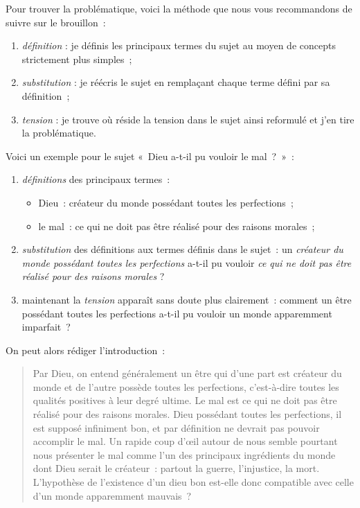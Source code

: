 \documentclass[a4paper]{article}
\begin{document}
Pour trouver la problématique, voici la méthode que nous vous
recommandons de suivre sur le brouillon :

\begin{enumerate}
\item \emph{définition} : je définis les principaux termes du sujet au moyen de
concepts strictement plus simples ;

\item \emph{substitution} : je réécris le sujet en remplaçant chaque terme
défini par sa définition ;

\item \emph{tension} : je trouve où réside la tension dans le sujet ainsi
reformulé et j'en tire la problématique.
\end{enumerate}

Voici un exemple pour le sujet « Dieu a-t-il pu vouloir le mal ? » :

\begin{enumerate}
\item \emph{définitions} des principaux termes :

\begin{itemize}
\item Dieu : créateur du monde possédant toutes les perfections ;

\item le mal : ce qui ne doit pas être réalisé pour des raisons
morales ;
\end{itemize}

\item \emph{substitution} des définitions aux termes définis dans le sujet : un
\emph{créateur du monde possédant toutes les perfections} a-t-il pu
vouloir \emph{ce qui ne doit pas être réalisé pour des raisons morales} ?

\item maintenant la \emph{tension} apparaît sans doute plus clairement : comment
un être possédant toutes les perfections a-t-il pu vouloir un monde
apparemment imparfait ?
\end{enumerate}

On peut alors rédiger l'introduction :

\begin{quote}
Par Dieu, on entend généralement un être qui d'une part est créateur
du monde et de l'autre possède toutes les perfections, c'est-à-dire
toutes les qualités positives à leur degré ultime. Le mal est ce qui
ne doit pas être réalisé pour des raisons morales. Dieu possédant
toutes les perfections, il est supposé infiniment bon, et par
définition ne devrait pas pouvoir accomplir le mal. Un rapide coup
d'œil autour de nous semble pourtant nous présenter le mal comme l'un
des principaux ingrédients du monde dont Dieu serait le créateur :
partout la guerre, l'injustice, la mort. L'hypothèse de l'existence
d'un dieu bon est-elle donc compatible avec celle d'un monde
apparemment mauvais ?
\end{quote}
\end{document}
